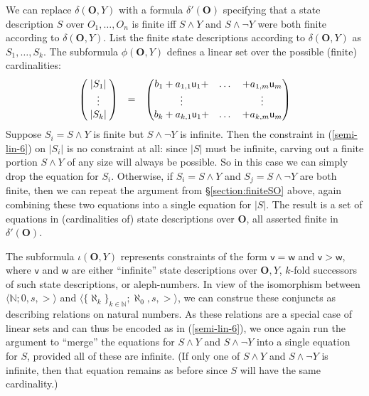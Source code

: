 \documentclass[12pt,oneside,reqno]{amsart}
\theoremstyle{definition}
\begin{document}
We can replace $\delta(\mathbf{O},Y)$ with a formula $\delta'(\mathbf{O})$ specifying that a state description $S$ over $O_1,\dots,O_n$ is finite iff $S \wedge Y$ and $S \wedge \neg Y$ were both finite according to $\delta(\mathbf{O},Y)$. List the finite state descriptions according to $\delta(\mathbf{O},Y)$ as $S_1,\dots,S_k$. The subformula $\phi(\mathbf{O},Y)$ defines a linear set over the possible (finite) cardinalities:
\begin{equation}
 \begin{pmatrix}
\;|S_1|\;  \\
\vdots  \\
|S_{k}|  
\end{pmatrix} \hspace{.1in}= \hspace{.1in}
\begin{pmatrix}
b_1 + a_{1,1}\mathsf{u}_1 + & \dots  & + a_{1,m}\mathsf{u}_m  \\
 \vdots & & \vdots \\
b_{k} + a_{k,1}\mathsf{u}_1 + & \dots & +  a_{k,m}\mathsf{u}_m
\end{pmatrix} \label{semi-lin-6}
\end{equation} Suppose $S_i = S \wedge Y$ is finite but $S \wedge \neg Y$ is infinite. Then the constraint in (\ref{semi-lin-6}) on $|S_i|$ is no constraint at all: since $|S|$ must be infinite, carving out a finite portion $S \wedge Y$ of any size will always be possible. So in this case we can simply drop the equation for $S_i$. Otherwise, if $S_i = S\wedge Y$ and $S_j=S \wedge \neg Y$ are both finite, then we can repeat the argument from \S\ref{section:finiteSO} above, again combining these two equations into a single equation for $|S|$. The result is a set of equations in (cardinalities of) state descriptions over $\mathbf{O}$, all asserted finite in $\delta'(\mathbf{O})$.

The subformula $\iota(\mathbf{O},Y)$ represents constraints of the form $\mathsf{v}=\mathsf{w}$ and $\mathsf{v}>\mathsf{w}$, where $\mathsf{v}$ and $\mathsf{w}$ are either ``infinite'' state descriptions over $\mathbf{O},Y$, $k$-fold successors of such  state descriptions, or aleph-numbers. In view of the isomorphism between $\langle \mathbb{N};0,s,> \rangle$ and 
$\langle \{\aleph_k\}_{k \in \mathbb{N}};\aleph_0,s,>\rangle$, we can construe these conjuncts as describing relations on natural numbers. As these relations are a special case of linear sets and can thus be encoded as in (\ref{semi-lin-6}), we once again run the argument to ``merge'' the equations for $S \wedge Y$ and $S \wedge \neg Y$ into a single equation for $S$, provided all of these are infinite. (If only one of $S \wedge Y$ and $S \wedge \neg Y$ is infinite, then that equation remains as before since $S$ will have the same cardinality.) 
\end{document}
